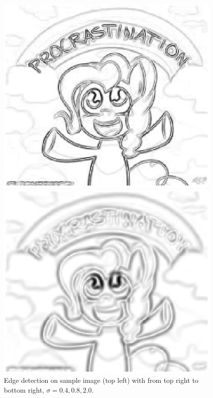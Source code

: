 \documentclass[11pt]{article}
\begin{document}
\begin{figure}[!htbp]
   \begin{minipage}[b]{0.3\textwidth}
    \includegraphics[width=\textwidth]{sigma8_procrastination.png}
  \end{minipage}
   \begin{minipage}[b]{0.3\textwidth}
    \includegraphics[width=\textwidth]{sigma20_procrastination.png}
  \end{minipage}
  \caption{Edge detection on sample image (top left) with from top right to bottom right, $\sigma=0.4, 0.8, 2.0$.}
\end{figure}
\end{document}
